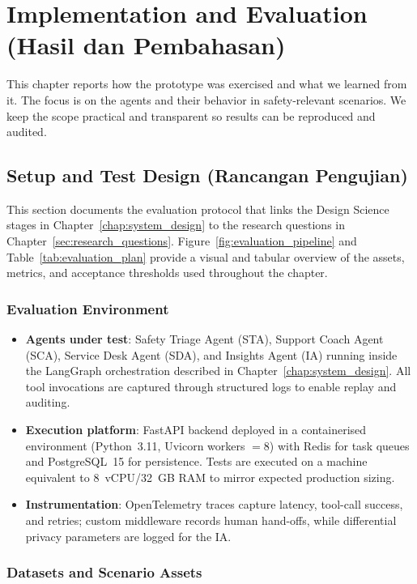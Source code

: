\chapter{Implementation and Evaluation (Hasil dan Pembahasan)}

This chapter reports how the prototype was exercised and what we learned from it. The focus is on the agents and their behavior in safety‑relevant scenarios. We keep the scope practical and transparent so results can be reproduced and audited.

\section{Setup and Test Design (Rancangan Pengujian)}
\label{sec:setup}

This section documents the evaluation protocol that links the Design Science stages in Chapter~\ref{chap:system_design} to the research questions in Chapter~\ref{sec:research_questions}. Figure~\ref{fig:evaluation_pipeline} and Table~\ref{tab:evaluation_plan} provide a visual and tabular overview of the assets, metrics, and acceptance thresholds used throughout the chapter.

\subsection*{Evaluation Environment}

\begin{itemize}
    \item \textbf{Agents under test}: Safety Triage Agent (STA), Support Coach Agent (SCA), Service Desk Agent (SDA), and Insights Agent (IA) running inside the LangGraph orchestration described in Chapter~\ref{chap:system_design}. All tool invocations are captured through structured logs to enable replay and auditing.
    \item \textbf{Execution platform}: FastAPI backend deployed in a containerised environment (Python~3.11, Uvicorn workers $=8$) with Redis for task queues and PostgreSQL~15 for persistence. Tests are executed on a machine equivalent to 8~vCPU/32~GB RAM to mirror expected production sizing.
    \item \textbf{Instrumentation}: OpenTelemetry traces capture latency, tool-call success, and retries; custom middleware records human hand-offs, while differential privacy parameters are logged for the IA.
\end{itemize}

\subsection*{Datasets and Scenario Assets}

